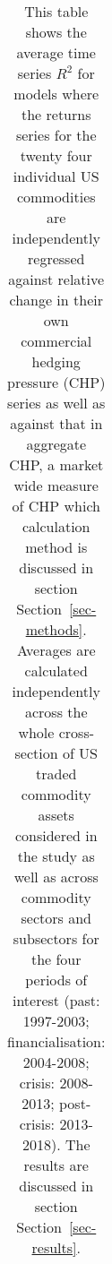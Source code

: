 \documentclass[
  authoryear,
  preprint,
  3p]{elsarticle}
\begin{document}
\endgroup{}

\newpage

\begingroup\fontsize{7}{9}\selectfont

\begin{longtable}[t]{>{}l>{}l>{}l>{}r>{}r>{}r>{}r}

\caption{\label{tbl-time-reg-US-CHP}This table shows the average time
series \(R^{2}\) for models where the returns series for the twenty four
individual US commodities are independently regressed against relative
change in their own commercial hedging pressure (CHP) series as well as
against that in aggregate CHP, a market wide measure of CHP which
calculation method is discussed in section Section~\ref{sec-methods}.
Averages are calculated independently across the whole cross-section of
US traded commodity assets considered in the study as well as across
commodity sectors and subsectors for the four periods of interest (past:
1997-2003; financialisation: 2004-2008; crisis: 2008-2013; post-crisis:
2013-2018). The results are discussed in section
Section~\ref{sec-results}.}

\tabularnewline


\end{longtable}
\end{document}
